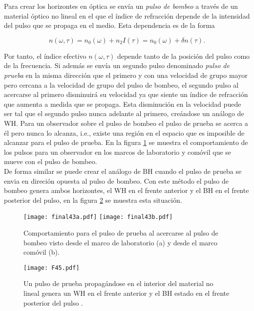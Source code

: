 Para crear los horizontes en \'{o}ptica se envía un \textit{pulso de bombeo} a través de un material óptico no lineal en el que el índice de refracción depende de la intensidad del pulso que se propaga en el medio. Esta dependencia es de la forma

\begin{equation}\label{n2}
n(\omega,\tau)=n_{0}(\omega)+n_2I(\tau)=n_{0}(\omega)+\delta n(\tau).
\end{equation}

Por tanto, el índice efectivo $n(\omega,\tau)$ depende tanto de la posici\'{o}n del pulso como de la frecuencia. Si adem\'{a}s se env\'{i}a un segundo pulso denominado \textit{pulso de prueba} en la misma direcci\'{o}n que el primero y con una velocidad de grupo mayor pero cercana a la velocidad de grupo del pulso de bombeo, el segundo pulso al acercarse al primero disminuir\'{a} su velocidad ya que siente un \'{i}ndice de refracci\'{o}n que aumenta a medida que se propaga. Esta disminuci\'{o}n en la velocidad puede ser tal que el segundo pulso nunca adelante al primero, cre\'{a}ndose un an\'{a}logo de WH. Para un observador sobre el pulso de bombeo el pulso de prueba se acerca a \'{e}l pero nunca lo alcanza, i.e., existe una regi\'{o}n en el espacio que es imposible de alcanzar para el pulso de prueba. En la figura \ref{fig:analogoopticoWH} se muestra el comportamiento de los pulsos para un observador en los marcos de laboratorio y com\'{o}vil que se mueve con el pulso de bombeo.\\

De forma similar se puede crear el an\'{a}logo de BH cuando el pulso de prueba se envia en direci\'{o}n opuesta al pulso de bombeo. Con este m\'{e}todo el pulso de bombeo genera ambos horizontes, el WH en el frente anterior y el BH en el frente posterior del pulso, en la figura \ref{fig:analogoWHBH} se muestra esta situaci\'{o}n.

\begin{figure}
   \centering
   \texttt{[image: final43a.pdf]}%
   \hspace{0.1cm}%
   \texttt{[image: final43b.pdf]}%
   \caption{Comportamiento para el pulso de prueba al acercarse al pulso de bombeo visto desde el marco de laboratorio (a) y desde el marco com\'{o}vil (b).} 
   \label{fig:analogoopticoWH}
\end{figure}



\begin{figure}
   \centering
   \texttt{[image: F45.pdf]}%
   \caption{Un pulso de prueba propag\'{a}ndose en el interior del material no lineal genera un WH en el frente anterior y el BH estado en el frente posterior del pulso .} 
   \label{fig:analogoWHBH}
\end{figure}

